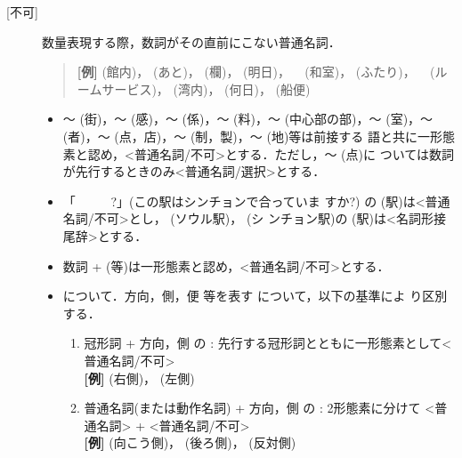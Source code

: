 \begin{description}
\item[{[不可]}] 数量表現する際，数詞がその直前にこない普通名詞．

\begin{quote}
{\bf [例]} 
(館内)，
(あと)，
(欄)，
(明日)，
\ 
(和室)，
(ふたり)，
\ 
(ルームサービス)，
(湾内)，
(何日)，
(船便)
\end{quote}

\begin{itemize}        

    \item 〜
(街)，〜
(感)，〜
(係)，〜
(料)，〜
(中心部の部)，〜
(室)，〜
(者)，〜
(点，店)，〜
(制，製)，〜
(地)等は前接する
    語と共に一形態素と認め，<普通名詞/不可>とする．ただし，〜
(点)に
    ついては数詞が先行するときのみ<普通名詞/選択>とする．

    \item 「
\ 
\ 
\ 
?」(この駅はシンチョンで合っていま
    すか?) の 
(駅)は<普通名詞/不可>とし，
(ソウル駅)，
(シ
    ンチョン駅)の 
(駅)は<名詞形接尾辞>とする．

    \item 
    数詞 + 
(等)は一形態素と認め，<普通名詞/不可>とする．

    \item {}
について．方向，側，便 等を表す
について，以下の基準によ
    り区別する．

    \begin{enumerate}
    \item 冠形詞 + 方向，側 の
    : 先行する冠形詞とともに一形態素として<普通名詞/不可>\\
    {\bf [例]} 
(右側)， 
(左側)

    \item 普通名詞(または動作名詞) + 方向，側 の 
    : 2形態素に分けて <普通名詞> + 
<普通名詞/不可>\\
    {\bf [例]} 
(向こう側)，
(後ろ側)，
(反対側)


\end{enumerate}
\end{itemize}
\end{description}
